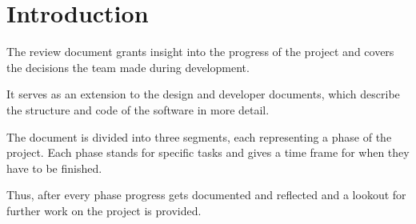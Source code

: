 \section{Introduction}
The review document grants insight into the progress of the project and covers the decisions the team made during development.

It serves as an extension to the design and developer documents, which describe the structure and code of the software in more detail.

The document is divided into three segments, each representing a phase of the project. 
Each phase stands for specific tasks and gives a time frame for when they have to be finished.

Thus, after every phase progress gets documented and reflected and a lookout for further work on the project is provided. 
 
   